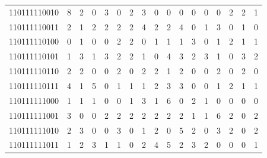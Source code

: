 \documentclass[10pt,a4paper]{article}
\begin{document}
\begin{longtable}{ |c|c|c|c|c|c|c|c|c|c|c|c|c|c|c|c|c| }
    110111110010              & 8                            & 2                                & 0                            & 3                              & 0   & 2   & 3   & 0   & 0   & 0   & 0   & 0   & 0   & 2   & 2   & 1   \\
    110111110011              & 2                            & 1                                & 2                            & 2                              & 2   & 2   & 4   & 2   & 2   & 4   & 0   & 1   & 3   & 0   & 1   & 0   \\
    110111110100              & 0                            & 1                                & 0                            & 0                              & 2   & 2   & 0   & 1   & 1   & 1   & 3   & 0   & 1   & 2   & 1   & 1   \\
    110111110101              & 1                            & 3                                & 1                            & 3                              & 2   & 2   & 1   & 0   & 4   & 3   & 2   & 3   & 1   & 0   & 3   & 2   \\
    110111110110              & 2                            & 2                                & 0                            & 0                              & 2   & 0   & 2   & 2   & 1   & 2   & 0   & 0   & 2   & 0   & 2   & 0   \\
    110111110111              & 4                            & 1                                & 5                            & 0                              & 1   & 1   & 1   & 2   & 3   & 3   & 0   & 0   & 1   & 2   & 1   & 1   \\
    110111111000              & 1                            & 1                                & 1                            & 0                              & 0   & 1   & 3   & 1   & 6   & 0   & 2   & 1   & 0   & 0   & 0   & 0   \\
    110111111001              & 3                            & 0                                & 0                            & 2                              & 2   & 2   & 2   & 2   & 2   & 2   & 1   & 1   & 6   & 2   & 0   & 2   \\
    110111111010              & 2                            & 3                                & 0                            & 0                              & 3   & 0   & 1   & 2   & 0   & 5   & 2   & 0   & 3   & 2   & 0   & 2   \\
    110111111011              & 1                            & 2                                & 3                            & 1                              & 1   & 0   & 2   & 4   & 5   & 2   & 3   & 2   & 0   & 0   & 0   & 1   \\

\end{longtable}
\end{document}
